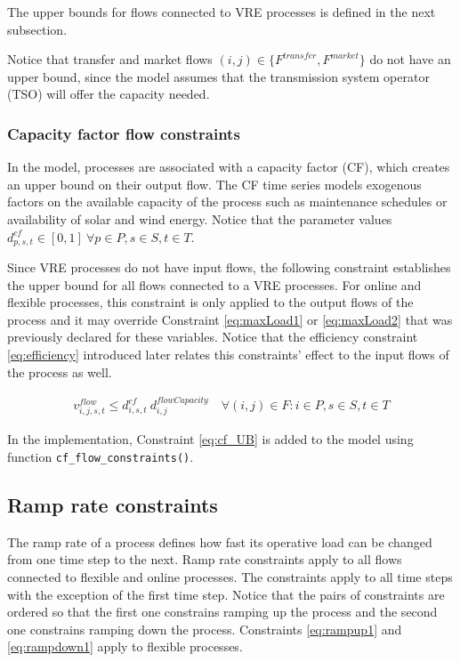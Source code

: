 \documentclass{article}
\begin{document}
The upper bounds for flows connected to VRE processes is defined in the next subsection. 

Notice that transfer and market flows $(i,j) \in \{F^{transfer}, F^{market}\}$ do not have an upper bound, since the model assumes that the transmission system operator (TSO) will offer the capacity needed. %

\subsubsection{Capacity factor flow constraints}

In the model, processes are associated with a capacity factor (CF), which creates an upper bound on their output flow. The CF time series models exogenous factors on the available capacity of the process such as maintenance schedules or availability of solar and wind energy. Notice that the parameter values $d^{cf}_{p,s,t} \in [0,1] \ \forall p \in P, s \in S, t \in T$.

Since VRE processes do not have input flows, the following constraint establishes the upper bound for all flows connected to a VRE processes. For online and flexible processes, this constraint is only applied to the output flows of the process and it may override Constraint \eqref{eq:maxLoad1} or \eqref{eq:maxLoad2} that was previously declared for these variables. Notice that the efficiency constraint \eqref{eq:efficiency} introduced later relates this constraints' effect to the input flows of the process as well.

\begin{align}
    v^{flow}_{i,j,s,t} \leq d^{cf}_{i,s,t} \ d^{flowCapacity}_{i,j} \quad \forall (i,j) \in F: i \in P, s \in S, t\in T 
     \label{eq:cf_UB}
\end{align}

In the implementation, Constraint \eqref{eq:cf_UB} is added to the model using function \texttt{cf\_flow\_constraints()}.

\subsection{Ramp rate constraints}

The ramp rate of a process defines how fast its operative load can be changed from one time step to the next. Ramp rate constraints apply to all flows connected to flexible and online processes. The constraints apply to all time steps with the exception of the first time step. Notice that the pairs of constraints are ordered so that the first one constrains ramping up the process and the second one constrains ramping down the process. Constraints \eqref{eq:rampup1} and \eqref{eq:rampdown1} apply to flexible processes. 
\end{document}

